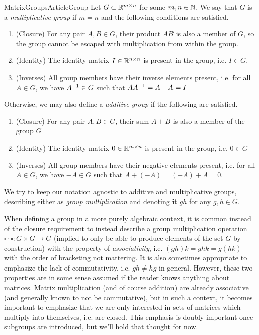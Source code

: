 \documentclass[11pt]{article}
\begin{document}
\begin{label definition}{MatrixGroupsArticleGroup}
Let $G \subset \mathbb{R}^{m \times n}$ for some $m, n \in \mathbb{N}$. We say that $G$ is a \emph{multiplicative group} if $m=n$ and the following conditions are satisfied. \begin{enumerate}
\item (Closure) For any pair $A,B \in G$, their product $AB$ is also a member of $G$, so the group cannot be escaped with multiplication from within the group.
\item (Identity) The identity matrix $I \in \mathbb{R}^{n \times n}$ is present in the group, i.e. $I \in G$.
\item (Inverses) All group members have their inverse elements present, i.e. for all $A \in G$, we have $A^{-1} \in G$ such that $A A^{-1} = A^{-1} A = I$
\end{enumerate}
Otherwise, we may also define a \emph{additive group} if the following are satisfied. \begin{enumerate}
\item (Closure) For any pair $A,B \in G$, their sum $A + B$ is also a member of the group $G$
\item (Identity) The identity matrix $0 \in \mathbb{R}^{m \times n}$ is present in the group, i.e. $0 \in G$
\item (Inverses) All group members have their negative elements present, i.e. for all $A\in G$, we have $-A \in G$ such that $A + (-A) = (-A) + A = 0$.
\end{enumerate}
We try to keep our notation agnostic to additive and multiplicative groups, describing either as \emph{group multiplication} and denoting it $gh$ for any $g,h \in G$.
\end{label definition}

When defining a group in a more purely algebraic context, it is common instead of the closure requirement to instead describe a group multiplication operation $\square \cdot \square: G \times G \to G$ (implied to only be able to produce elements of the set $G$ by construction) with the property of \emph{associativity}, i.e. $(gh)k = ghk = g(hk)$ with the order of bracketing not mattering. It is also sometimes appropriate to emphasize the lack of commutativity, i.e. $gh \neq hg$ in general. However, these two properties are in some sense assumed if the reader knows anything about matrices. Matrix multiplication (and of course addition) are already associative (and generally known to not be commutative), but in such a context, it becomes important to emphasize that we are only interested in sets of matrices which multiply into themselves, i.e. are closed. This emphasis is doubly important once subgroups are introduced, but we'll hold that thought for now.
\end{document}
